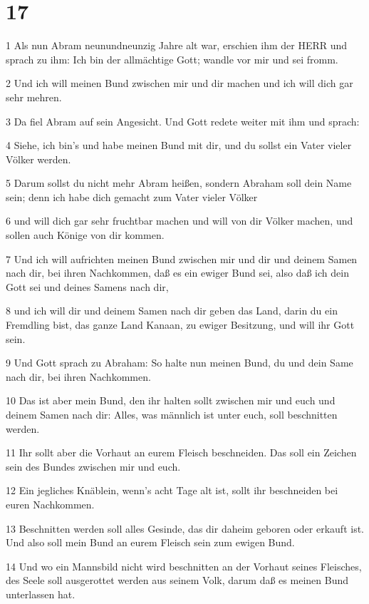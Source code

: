\chapter{17}

\par 1 Als nun Abram neunundneunzig Jahre alt war, erschien ihm der HERR und sprach zu ihm: Ich bin der allmächtige Gott; wandle vor mir und sei fromm.
\par 2 Und ich will meinen Bund zwischen mir und dir machen und ich will dich gar sehr mehren.
\par 3 Da fiel Abram auf sein Angesicht. Und Gott redete weiter mit ihm und sprach:
\par 4 Siehe, ich bin's und habe meinen Bund mit dir, und du sollst ein Vater vieler Völker werden.
\par 5 Darum sollst du nicht mehr Abram heißen, sondern Abraham soll dein Name sein; denn ich habe dich gemacht zum Vater vieler Völker
\par 6 und will dich gar sehr fruchtbar machen und will von dir Völker machen, und sollen auch Könige von dir kommen.
\par 7 Und ich will aufrichten meinen Bund zwischen mir und dir und deinem Samen nach dir, bei ihren Nachkommen, daß es ein ewiger Bund sei, also daß ich dein Gott sei und deines Samens nach dir,
\par 8 und ich will dir und deinem Samen nach dir geben das Land, darin du ein Fremdling bist, das ganze Land Kanaan, zu ewiger Besitzung, und will ihr Gott sein.
\par 9 Und Gott sprach zu Abraham: So halte nun meinen Bund, du und dein Same nach dir, bei ihren Nachkommen.
\par 10 Das ist aber mein Bund, den ihr halten sollt zwischen mir und euch und deinem Samen nach dir: Alles, was männlich ist unter euch, soll beschnitten werden.
\par 11 Ihr sollt aber die Vorhaut an eurem Fleisch beschneiden. Das soll ein Zeichen sein des Bundes zwischen mir und euch.
\par 12 Ein jegliches Knäblein, wenn's acht Tage alt ist, sollt ihr beschneiden bei euren Nachkommen.
\par 13 Beschnitten werden soll alles Gesinde, das dir daheim geboren oder erkauft ist. Und also soll mein Bund an eurem Fleisch sein zum ewigen Bund.
\par 14 Und wo ein Mannsbild nicht wird beschnitten an der Vorhaut seines Fleisches, des Seele soll ausgerottet werden aus seinem Volk, darum daß es meinen Bund unterlassen hat.
